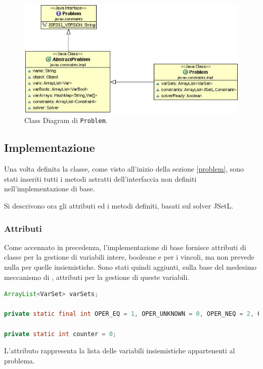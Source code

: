 \begin{figure}\label{problemUML}
\centering
\includegraphics[scale=.5]{img/Problem.JPG}
\caption{Class Diagram di \texttt{Problem}.}
\end{figure}

\subsection{Implementazione}
Una volta definita la classe, come visto all'inizio 
della sezione \ref{problem}, sono stati inseriti tutti i metodi astratti
dell'interfaccia  non definiti nell'implementazione di base. 

Si descrivono ora gli attributi ed i metodi definiti, basati sul solver JSetL.

\subsubsection{Attributi}
Come accennato in precedenza, l'implementazione di base fornisce attributi
di classe per la gestione di variabili intere, booleane e per i vincoli, ma
non prevede nulla per quelle insiemistiche. Sono stati quindi aggiunti,
sulla base del medesimo meccanismo di , attributi
per la gestione di queste variabili.
\begin{lstlisting}[language = Java,
                   caption = {attributi di \texttt{Problem}.}]
ArrayList<VarSet> varSets;

private static final int OPER_EQ = 1, OPER_UNKNOWN = 0, OPER_NEQ = 2, OPER_LT = 3, OPER_LEQ = 4, OPER_GT = 5, OPER_GEQ = 6;

private static int counter = 0;
\end{lstlisting}
L'attributo
 rappresenta la lista delle variabili insiemistiche appartenenti 
al problema. 

